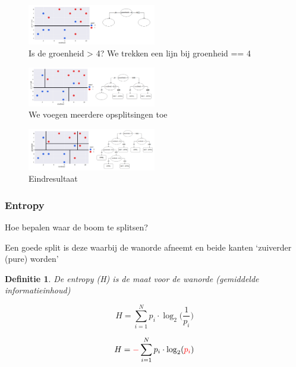 \documentclass{article}
\newtheorem{theorem}{Definitie}[section]
\begin{document}
\begin{figure}[H]
    \centering
    \includegraphics[width=0.5\textwidth]{decision-tree-1.png}
    \caption{Is de groenheid > 4? We trekken een lijn bij groenheid == 4}
\end{figure}

\begin{figure}[H]
    \centering
    \includegraphics[width=0.5\textwidth]{decision-tree-2.png}
    \caption{We voegen meerdere opsplitsingen toe}
\end{figure}

\begin{figure}[H]
    \centering
    \includegraphics[width=0.5\textwidth]{decision-tree-3.png}
    \caption{Eindresultaat}
\end{figure}

\subsubsection{Entropy}

Hoe bepalen waar de boom te splitsen?

Een goede split is deze waarbij de wanorde afneemt en beide kanten `zuiverder (pure) worden'

\begin{theorem}
    De entropy (H) is de maat voor de wanorde (gemiddelde informatieinhoud)
\end{theorem}

\begin{equation}
    H = \sum_{i=1}^N p_i \cdot \log_2 \Big(\frac{1}{p_i}\Big)
\end{equation}

\begin{equation}
    H = \textcolor{red}{-} \sum_{i=1}^N p_i \cdot \log_2 (\textcolor{red}{p_i})
\end{equation}
\end{document}
